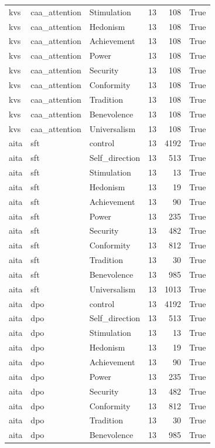 \begin{tabular}{lllrrr}
kvs & caa\_attention & Stimulation & 13 & 108 & True \\
kvs & caa\_attention & Hedonism & 13 & 108 & True \\
kvs & caa\_attention & Achievement & 13 & 108 & True \\
kvs & caa\_attention & Power & 13 & 108 & True \\
kvs & caa\_attention & Security & 13 & 108 & True \\
kvs & caa\_attention & Conformity & 13 & 108 & True \\
kvs & caa\_attention & Tradition & 13 & 108 & True \\
kvs & caa\_attention & Benevolence & 13 & 108 & True \\
kvs & caa\_attention & Universalism & 13 & 108 & True \\
aita & sft & control & 13 & 4192 & True \\
aita & sft & Self\_direction & 13 & 513 & True \\
aita & sft & Stimulation & 13 & 13 & True \\
aita & sft & Hedonism & 13 & 19 & True \\
aita & sft & Achievement & 13 & 90 & True \\
aita & sft & Power & 13 & 235 & True \\
aita & sft & Security & 13 & 482 & True \\
aita & sft & Conformity & 13 & 812 & True \\
aita & sft & Tradition & 13 & 30 & True \\
aita & sft & Benevolence & 13 & 985 & True \\
aita & sft & Universalism & 13 & 1013 & True \\
aita & dpo & control & 13 & 4192 & True \\
aita & dpo & Self\_direction & 13 & 513 & True \\
aita & dpo & Stimulation & 13 & 13 & True \\
aita & dpo & Hedonism & 13 & 19 & True \\
aita & dpo & Achievement & 13 & 90 & True \\
aita & dpo & Power & 13 & 235 & True \\
aita & dpo & Security & 13 & 482 & True \\
aita & dpo & Conformity & 13 & 812 & True \\
aita & dpo & Tradition & 13 & 30 & True \\
aita & dpo & Benevolence & 13 & 985 & True \\

\end{tabular}
